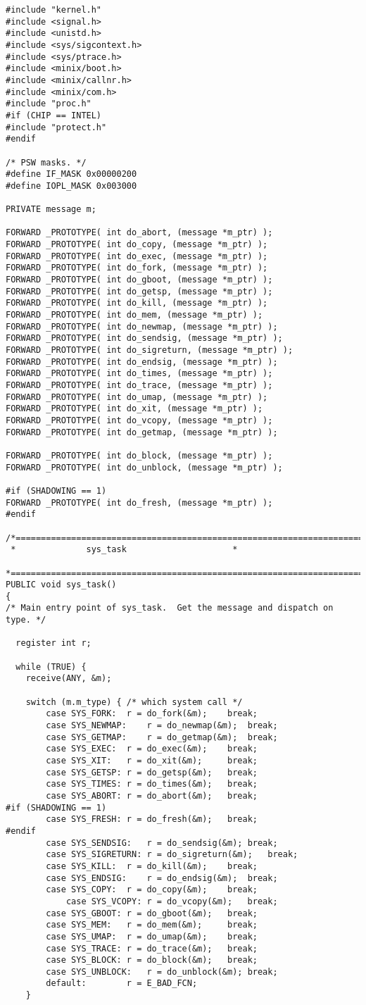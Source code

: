 \begin{verbatim}
#include "kernel.h"
#include <signal.h>
#include <unistd.h>
#include <sys/sigcontext.h>
#include <sys/ptrace.h>
#include <minix/boot.h>
#include <minix/callnr.h>
#include <minix/com.h>
#include "proc.h"
#if (CHIP == INTEL)
#include "protect.h"
#endif

/* PSW masks. */
#define IF_MASK 0x00000200
#define IOPL_MASK 0x003000

PRIVATE message m;

FORWARD _PROTOTYPE( int do_abort, (message *m_ptr) );
FORWARD _PROTOTYPE( int do_copy, (message *m_ptr) );
FORWARD _PROTOTYPE( int do_exec, (message *m_ptr) );
FORWARD _PROTOTYPE( int do_fork, (message *m_ptr) );
FORWARD _PROTOTYPE( int do_gboot, (message *m_ptr) );
FORWARD _PROTOTYPE( int do_getsp, (message *m_ptr) );
FORWARD _PROTOTYPE( int do_kill, (message *m_ptr) );
FORWARD _PROTOTYPE( int do_mem, (message *m_ptr) );
FORWARD _PROTOTYPE( int do_newmap, (message *m_ptr) );
FORWARD _PROTOTYPE( int do_sendsig, (message *m_ptr) );
FORWARD _PROTOTYPE( int do_sigreturn, (message *m_ptr) );
FORWARD _PROTOTYPE( int do_endsig, (message *m_ptr) );
FORWARD _PROTOTYPE( int do_times, (message *m_ptr) );
FORWARD _PROTOTYPE( int do_trace, (message *m_ptr) );
FORWARD _PROTOTYPE( int do_umap, (message *m_ptr) );
FORWARD _PROTOTYPE( int do_xit, (message *m_ptr) );
FORWARD _PROTOTYPE( int do_vcopy, (message *m_ptr) );
FORWARD _PROTOTYPE( int do_getmap, (message *m_ptr) );

FORWARD _PROTOTYPE( int do_block, (message *m_ptr) );
FORWARD _PROTOTYPE( int do_unblock, (message *m_ptr) );

#if (SHADOWING == 1)
FORWARD _PROTOTYPE( int do_fresh, (message *m_ptr) );
#endif

/*===========================================================================*
 *				sys_task				     *
 *===========================================================================*/
PUBLIC void sys_task()
{
/* Main entry point of sys_task.  Get the message and dispatch on type. */

  register int r;

  while (TRUE) {
	receive(ANY, &m);

	switch (m.m_type) {	/* which system call */
	    case SYS_FORK:	r = do_fork(&m);	break;
	    case SYS_NEWMAP:	r = do_newmap(&m);	break;
	    case SYS_GETMAP:	r = do_getmap(&m);	break;
	    case SYS_EXEC:	r = do_exec(&m);	break;
	    case SYS_XIT:	r = do_xit(&m);		break;
	    case SYS_GETSP:	r = do_getsp(&m);	break;
	    case SYS_TIMES:	r = do_times(&m);	break;
	    case SYS_ABORT:	r = do_abort(&m);	break;
#if (SHADOWING == 1)
	    case SYS_FRESH:	r = do_fresh(&m);	break;
#endif
	    case SYS_SENDSIG:	r = do_sendsig(&m);	break;
	    case SYS_SIGRETURN: r = do_sigreturn(&m);	break;
	    case SYS_KILL:	r = do_kill(&m);	break;
	    case SYS_ENDSIG:	r = do_endsig(&m);	break;
	    case SYS_COPY:	r = do_copy(&m);	break;
            case SYS_VCOPY:	r = do_vcopy(&m);	break;
	    case SYS_GBOOT:	r = do_gboot(&m);	break;
	    case SYS_MEM:	r = do_mem(&m);		break;
	    case SYS_UMAP:	r = do_umap(&m);	break;
	    case SYS_TRACE:	r = do_trace(&m);	break;
	    case SYS_BLOCK:	r = do_block(&m);	break;
	    case SYS_UNBLOCK:	r = do_unblock(&m);	break;
	    default:		r = E_BAD_FCN;
	}


\end{verbatim}
